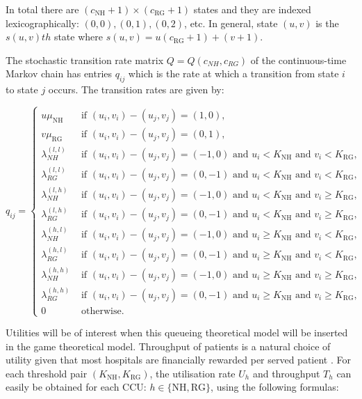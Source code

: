 \documentclass{article}
\newcommand{\NH}{\text{NH}}
\newcommand{\RG}{\text{RG}}
\begin{document}
In total there are $(c_{\NH}+1)\times(c_{\RG}+1)$ states and they are indexed lexicographically: $(0,0), (0,1), (0,2)$, etc. In general, state $(u,v)$ is the $s(u,v)th$ state where $s(u,v)=u(c_{\RG}+1)+(v+1)$.

The stochastic transition rate matrix $Q=Q(c_{NH},c_{RG})$ of the continuous-time Markov chain \cite{Stewart2009} has entries $q_{ij}$ which is the rate at which a transition from state $i$ to state $j$ occurs. The transition rates are given by:

\begin{equation}
q_{ij}=\begin{cases} u\mu_{\NH} & \text{ if  } (u_i,v_i)-(u_j,v_j)=(1,0),\\
 v\mu_{\RG} & \text{ if  } (u_i,v_i)-(u_j,v_j)=(0,1),\\
 \lambda_{NH}^{(l,l)} & \text{ if  } (u_i,v_i)-(u_j,v_j)=(-1,0)  \text{ and  } u_i < K_{\NH}  \text{ and  } v_i < K_{\RG},\\
 \lambda_{RG}^{(l,l)} & \text{ if  } (u_i,v_i)-(u_j,v_j)=(0,-1)  \text{ and  } u_i < K_{\NH}  \text{ and  } v_i < K_{\RG},\\
\lambda_{NH}^{(l,h)} & \text{ if  } (u_i,v_i)-(u_j,v_j)=(-1,0) \text{ and  } u_i < K_{\NH}  \text{ and  } v_i \geq K_{\RG},\\
\lambda_{RG}^{(l,h)} & \text{ if  } (u_i,v_i)-(u_j,v_j)=(0,-1) \text{ and  } u_i < K_{\NH}  \text{ and  } v_i \geq K_{\RG},\\
\lambda_{NH}^{(h,l)} & \text{ if  } (u_i,v_i)-(u_j,v_j)=(-1,0) \text{ and  } u_i \geq K_{\NH}  \text{ and  } v_i < K_{\RG},\\
\lambda_{RG}^{(h,l)} & \text{ if  } (u_i,v_i)-(u_j,v_j)=(0,-1) \text{ and  } u_i \geq K_{\NH}  \text{ and  } v_i < K_{\RG},\\
\lambda_{NH}^{(h,h)} & \text{ if  } (u_i,v_i)-(u_j,v_j)=(-1,0) \text{ and  } u_i \geq K_{\NH}  \text{ and  } v_i \geq K_{\RG},\\
\lambda_{RG}^{(h,h)} & \text{ if  } (u_i,v_i)-(u_j,v_j)=(0,-1) \text{ and  } u_i \geq K_{\NH}  \text{ and  } v_i \geq K_{\RG},\\
0 & \text{ otherwise}.
\end{cases}
\end{equation}

Utilities will be of interest when this queueing theoretical model will be inserted in the game theoretical model.
Throughput of patients is a natural choice of utility given that most hospitals are financially rewarded per served patient \cite{Pate2009}.
For each threshold pair $(K_{\NH},K_{\RG})$, the utilisation rate $U_h$ and throughput $T_h$ can easily be obtained for each CCU: $h\in\{\text{NH},\text{RG}\}$, using the following formulas:
\end{document}
